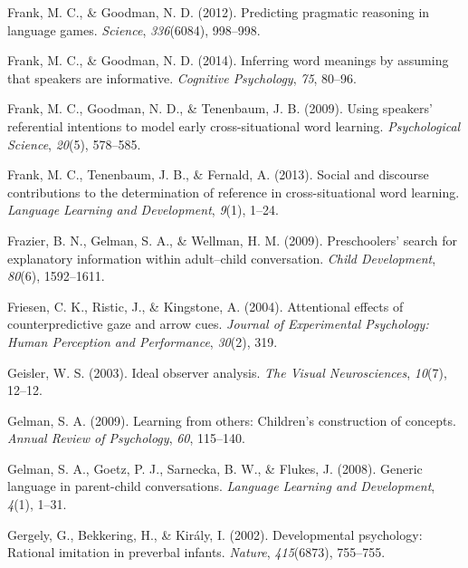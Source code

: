 \documentclass[oneside]{report}
\begin{document}
\leavevmode\hypertarget{ref-frank2012predicting}{}%
Frank, M. C., \& Goodman, N. D. (2012). Predicting pragmatic reasoning
in language games. \emph{Science}, \emph{336}(6084), 998--998.

\leavevmode\hypertarget{ref-frank2014inferring}{}%
Frank, M. C., \& Goodman, N. D. (2014). Inferring word meanings by
assuming that speakers are informative. \emph{Cognitive Psychology},
\emph{75}, 80--96.

\leavevmode\hypertarget{ref-frank2009using}{}%
Frank, M. C., Goodman, N. D., \& Tenenbaum, J. B. (2009). Using
speakers' referential intentions to model early cross-situational word
learning. \emph{Psychological Science}, \emph{20}(5), 578--585.

\leavevmode\hypertarget{ref-frank2013social}{}%
Frank, M. C., Tenenbaum, J. B., \& Fernald, A. (2013). Social and
discourse contributions to the determination of reference in
cross-situational word learning. \emph{Language Learning and
Development}, \emph{9}(1), 1--24.

\leavevmode\hypertarget{ref-frazier2009preschoolers}{}%
Frazier, B. N., Gelman, S. A., \& Wellman, H. M. (2009). Preschoolers'
search for explanatory information within adult--child conversation.
\emph{Child Development}, \emph{80}(6), 1592--1611.

\leavevmode\hypertarget{ref-friesen2004attentional}{}%
Friesen, C. K., Ristic, J., \& Kingstone, A. (2004). Attentional effects
of counterpredictive gaze and arrow cues. \emph{Journal of Experimental
Psychology: Human Perception and Performance}, \emph{30}(2), 319.

\leavevmode\hypertarget{ref-geisler2003ideal}{}%
Geisler, W. S. (2003). Ideal observer analysis. \emph{The Visual
Neurosciences}, \emph{10}(7), 12--12.

\leavevmode\hypertarget{ref-gelman2009learning}{}%
Gelman, S. A. (2009). Learning from others: Children's construction of
concepts. \emph{Annual Review of Psychology}, \emph{60}, 115--140.

\leavevmode\hypertarget{ref-gelman2008generic}{}%
Gelman, S. A., Goetz, P. J., Sarnecka, B. W., \& Flukes, J. (2008).
Generic language in parent-child conversations. \emph{Language Learning
and Development}, \emph{4}(1), 1--31.

\leavevmode\hypertarget{ref-gergely2002developmental}{}%
Gergely, G., Bekkering, H., \& Király, I. (2002). Developmental
psychology: Rational imitation in preverbal infants. \emph{Nature},
\emph{415}(6873), 755--755.
\end{document}
